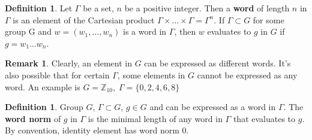 \documentclass{book}
\newcommand{\Z}{\mathbb{Z}}
\newcommand{\define}[1]{\textbf{#1}}
\theoremstyle{definition}
\newtheorem{definition}[lemma]{Definition}
\theoremstyle{remarkstyle}
\newtheorem*{remark}{Remark}%
\begin{document}
\begin{definition}
    Let $\Gamma$ be a set, $n$ be a positive integer. Then a \define{word} of length $n$ in $\Gamma$ is an element of the Cartesian product $\Gamma \times \dots \times \Gamma = \Gamma^{n} $. If $\Gamma \subset G $ for some group G and $w = (w_{1}, \dots, w_{n}) $ is a word in $\Gamma$, then $w$ evaluates to $g$ in $G$ if $g = w_{1}\dots w_{n} $.
\end{definition}
\begin{remark}
    Clearly, an element in $G$ can be expressed as different words. It's also possible that for certain $\Gamma$, some elements in $G$ cannot be expressed as any word. An example is $G=\Z_{10}, \; \Gamma = \{0,2,4,6,8\} $ \newline
\end{remark}


\begin{definition}
    Group $G$, $\Gamma \subset G$, $g \in G$ and can be expressed as a word in $\Gamma$. The \define{word norm} of $g$ in $\Gamma$ is the minimal length of any word in $\Gamma$ that evaluates to $g$. By convention, identity element has word norm 0. \newline
\end{definition}
\end{document}
